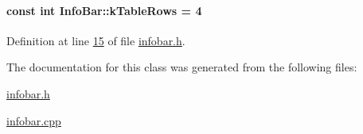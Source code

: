 \paragraph[{k\+Table\+Rows}]{\setlength{\rightskip}{0pt plus 5cm}const int Info\+Bar\+::k\+Table\+Rows = 4\hspace{0.3cm}{\ttfamily [static]}}\label{class_info_bar_ad54d2dd19a63caf9d2476aace60ae3c5}


Definition at line \hyperlink{infobar_8h_source_l00015}{15} of file \hyperlink{infobar_8h_source}{infobar.\+h}.



The documentation for this class was generated from the following files\+:\begin{DoxyCompactItemize}
\item 
\hyperlink{infobar_8h}{infobar.\+h}\item 
\hyperlink{infobar_8cpp}{infobar.\+cpp}\end{DoxyCompactItemize}
